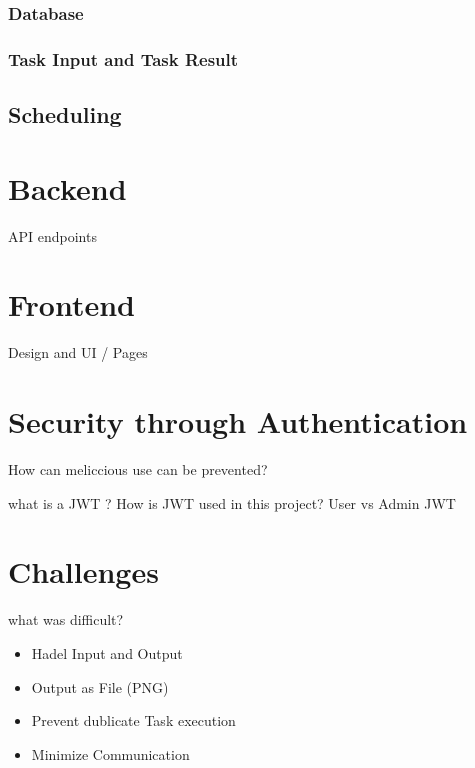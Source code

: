 \subsubsection{Database}

\subsubsection{Task Input and Task Result}

\subsection{Scheduling}
\label{subsec:implementation:architecture:scheduling}


\section{Backend}
\label{sec:implementation:backend}
API endpoints 

\section{Frontend}
\label{sec:implementation:frontend}
Design and UI / Pages

\section{Security through Authentication}
\label{sec:implementation:authentication}
How can meliccious use can be prevented?

what is a JWT ? How is JWT used in this project? User vs Admin JWT

\section{Challenges}
\label{sec:implementation:challenges}
what was difficult?
\begin{itemize}
    \item Hadel Input and Output
    \item Output as File (PNG)
    \item Prevent dublicate Task execution
    \item Minimize Communication
\end{itemize}